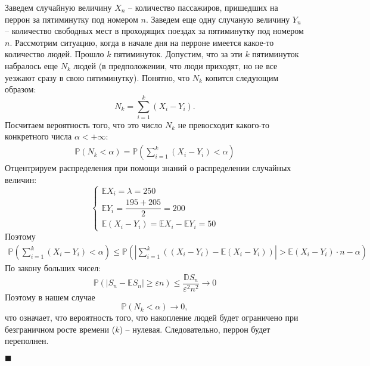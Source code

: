 \documentclass{article}
\begin{document}
\begin{enumerate}
Заведем случайную величину $X_n$ -- количество пассажиров, пришедших на перрон за пятиминутку под номером $n$. Заведем еще одну случаную величину $Y_n$ -- количество свободных мест в проходящих поездах за пятиминутку под номером $n$. Рассмотрим ситуацию, когда в начале дня на перроне имеется какое-то количество людей. Прошло $k$ пятиминуток. Допустим, что за эти $k$ пятиминуток набралось еще $N_k$ людей (в предположении, что люди приходят, но не все уезжают сразу в свою пятиминутку). Понятно, что $N_k$ копится следующим образом:
\begin{equation}
  N_k = \sum_{i=1}^{k} (X_i - Y_i).
\end{equation}
Посчитаем вероятность того, что это число $N_k$ не превосходит какого-то конкретного числа $\alpha < +\infty$:
\begin{eqnarray}
  \mathbb{P}(N_k < \alpha) = \mathbb{P}(\sum_{i=1}^{k} (X_i - Y_i) < \alpha)
\end{eqnarray}
Отцентрируем распределения при помощи знаний о распределении случайных величин:
\begin{equation}
  \begin{cases}
    \mathbb{E}X_i = \lambda = 250 \\
    \mathbb{E}Y_i = \dfrac{195+205}{2} = 200 \\
    \mathbb{E}(X_i - Y_i) = \mathbb{E}X_i - \mathbb{E}Y_i = 50
  \end{cases}
\end{equation}
Поэтому
\begin{eqnarray}
  \mathbb{P}\left(\sum_{i=1}^{k} (X_i - Y_i) < \alpha\right) \leq \mathbb{P}\left(\left|\sum_{i=1}^{k} \left((X_i - Y_i) - \mathbb{E}(X_i - Y_i)\right)\right| > \mathbb{E}(X_i - Y_i)\cdot n - \alpha\right)
\end{eqnarray}
По закону больших чисел:
\begin{equation}
  \mathbb{P}(|S_n - \mathbb{E}S_n| \geq \varepsilon n) \leq \dfrac{\mathbb{D}S_n}{\varepsilon^2 n^2} \rightarrow 0
\end{equation}
Поэтому в нашем случае
\begin{equation}
  \mathbb{P}(N_k < \alpha) \rightarrow 0,
\end{equation}
что означает, что вероятность того, что накопление людей будет ограничено при безграничном росте времени ($k$) -- нулевая. Следовательно, перрон будет переполнен.
\begin{flushright}
  $\blacksquare$
\end{flushright}


\end{enumerate}
\end{document}
